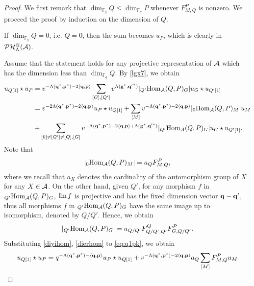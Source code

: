 \documentclass[reqno,12pt]{amsart}
\numberwithin{equation}{section}
\def\lr#1{\langle #1\rangle} \def\fin{\hfill$\square$}  \def\lra{\longrightarrow} \def\mod{\mbox{\rm \textbf{mod}}\,}\def\Mod{\mbox{\rm mod}\,}\def\top{\mbox{\rm top}\,}\def\soc{\mbox{\rm soc}\,}
\theoremstyle{plain} %
\theoremstyle{definition} %
\begin{document}
\begin{proof}
We first remark that $\dim_{\mathbb{F}_q}Q\leq \dim_{\mathbb{F}_q}P$ whenever $F_{M,Q}^{P}$ is nonzero.
We proceed the proof by induction on the dimension of $Q$.

If $\dim_{\mathbb{F}_q}Q=0$, i.e. $Q=0$, then the sum becomes $u_{P}$, which is clearly in $\mathcal {P}\mathcal {H}_\Lambda^{{\tilde{c}l}}({\mathcal{A}})$.

Assume that the statement holds for any projective representation of $\mathcal{A}$ which has the dimension less than $\dim_{\mathbb{F}_q}Q$.
By \eqref{lgx7}, we obtain
\begin{align}\label{eq:q1pk}
    u_{Q[1]}\star u_{P}&=v^{-\Lambda(\mathbf{q}^\ast,\mathbf{p}^\ast)-2\lr{\mathbf{q},\mathbf{p}}}\sum_{[G],[Q']}v^{\Lambda(\mathbf{g}^\ast,\mathbf{q'}^\ast)}|_{Q'}\Hom_{\A}(Q,P)_G|u_{G}\star u_{Q'[1]}\notag\\
    &=v^{-2\Lambda(\mathbf{q}^\ast,\mathbf{p}^\ast)-2\lr{\mathbf{q},\mathbf{p}}}u_{P}\star u_{Q[1]}+\sum_{[M]}v^{-\Lambda(\mathbf{q}^\ast,\mathbf{p}^\ast)-2\lr{\mathbf{q},\mathbf{p}}}|_0\Hom_{\A}(Q,P)_M|u_M\notag\\
    \quad &+\sum_{[0]\neq[Q']\neq[ Q],[G]}v^{-\Lambda(\mathbf{q}^\ast,\mathbf{p}^\ast)-2\lr{\mathbf{q},\mathbf{p}}+\Lambda(\mathbf{g}^\ast,\mathbf{q'}^\ast)}|_{Q'}\Hom_{\A}(Q,P)_G|u_G\star u_{Q'[1]}.
\end{align}
Note that \begin{equation}\label{diyihom}|_0\mbox{\rm Hom}_{\mathcal{A}}(Q,P)_M|=a_QF_{M,Q}^{P},\end{equation} where we recall that $a_X$ denotes the cardinality of the automorphism group of $X$ for any $X\in\mathcal{A}$.
On the other hand, given $Q'$, for any morphism $f$ in ${_{Q'}\mbox{\rm Hom}_{\mathcal{A}}(Q,P)_G}$, $\mbox{\rm Im}\, f$ is projective and has the fixed dimension vector ${\bf q}-{\bf q}'$, thus all morphisms $f$ in ${_{Q'}\mbox{\rm Hom}_{\mathcal{A}}(Q,P)_G}$ have the same image up to isomorphism, denoted by $Q/Q'$. Hence, we obtain
\begin{equation}\label{dierhom}|_{Q'}\mbox{\rm Hom}_{\mathcal{A}}(Q,P)_G|=a_{Q/Q'}F_{Q/Q',Q'}^QF_{G,Q/Q'}^{P}.\end{equation}
Substituting \eqref{diyihom}, \eqref{dierhom} to \eqref{eq:q1pk}, we obtain
\begin{align}\label{eq:q1pk-rewirtten}
    &u_{Q[1]}\star u_{P}=q^{-\Lambda(\mathbf{q}^\ast,\mathbf{p}^\ast)-\lr{\mathbf{q},\mathbf{p}}}u_{P}\star u_{Q[1]}+v^{-\Lambda(\mathbf{q}^\ast,\mathbf{p}^\ast)-2\lr{\mathbf{q},\mathbf{p}}}{a_Q}\sum_{[M]}F_{M,Q}^{P}u_M\notag\\

\end{align}
\end{proof}
\end{document}

